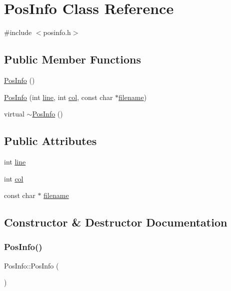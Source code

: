 \hypertarget{classPosInfo}{}\section{Pos\+Info Class Reference}
\label{classPosInfo}


{\ttfamily \#include $<$posinfo.\+h$>$}

\subsection*{Public Member Functions}
\begin{DoxyCompactItemize}
\item 
\hyperlink{classPosInfo_a828283f9428c078fa1c7df2ef3f48e2d}{Pos\+Info} ()
\item 
\hyperlink{classPosInfo_a87acb37bde91b4da7fadeaba819d16d8}{Pos\+Info} (int \hyperlink{classPosInfo_a1fbd2d0d0f4d2a20ade06f08e992da2c}{line}, int \hyperlink{classPosInfo_a7507047c71abe1f3db13b41ee340cc59}{col}, const char $\ast$\hyperlink{classPosInfo_acba31490cee179567ed7ab6a4c0c861b}{filename})
\item 
virtual \hyperlink{classPosInfo_a81518b89d4191e84f9de8f9c2d527577}{$\sim$\+Pos\+Info} ()
\end{DoxyCompactItemize}
\subsection*{Public Attributes}
\begin{DoxyCompactItemize}
\item 
int \hyperlink{classPosInfo_a1fbd2d0d0f4d2a20ade06f08e992da2c}{line}
\item 
int \hyperlink{classPosInfo_a7507047c71abe1f3db13b41ee340cc59}{col}
\item 
const char $\ast$ \hyperlink{classPosInfo_acba31490cee179567ed7ab6a4c0c861b}{filename}
\end{DoxyCompactItemize}


\subsection{Constructor \& Destructor Documentation}
\mbox{\label{classPosInfo_a828283f9428c078fa1c7df2ef3f48e2d}} 
\subsubsection{\texorpdfstring{Pos\+Info()}{PosInfo()}\hspace{0.1cm}{\footnotesize\ttfamily [1/2]}}
{\footnotesize\ttfamily Pos\+Info\+::\+Pos\+Info (\begin{DoxyParamCaption}{ }\end{DoxyParamCaption})}

